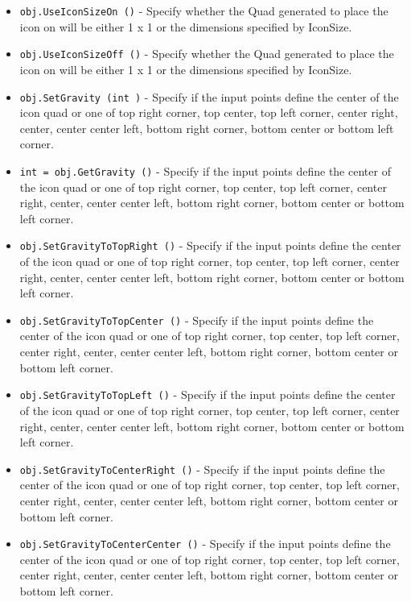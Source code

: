 \begin{itemize}
\item  \verb|obj.UseIconSizeOn ()| -  Specify whether the Quad generated to place the icon on will be either
 1 x 1 or the dimensions specified by IconSize.

\item  \verb|obj.UseIconSizeOff ()| -  Specify whether the Quad generated to place the icon on will be either
 1 x 1 or the dimensions specified by IconSize.

\item  \verb|obj.SetGravity (int )| -  Specify if the input points define the center of the icon quad or one of
 top right corner, top center, top left corner, center right, center, center
 center left, bottom right corner, bottom center or bottom left corner.

\item  \verb|int = obj.GetGravity ()| -  Specify if the input points define the center of the icon quad or one of
 top right corner, top center, top left corner, center right, center, center
 center left, bottom right corner, bottom center or bottom left corner.

\item  \verb|obj.SetGravityToTopRight ()| -  Specify if the input points define the center of the icon quad or one of
 top right corner, top center, top left corner, center right, center, center
 center left, bottom right corner, bottom center or bottom left corner.

\item  \verb|obj.SetGravityToTopCenter ()| -  Specify if the input points define the center of the icon quad or one of
 top right corner, top center, top left corner, center right, center, center
 center left, bottom right corner, bottom center or bottom left corner.

\item  \verb|obj.SetGravityToTopLeft ()| -  Specify if the input points define the center of the icon quad or one of
 top right corner, top center, top left corner, center right, center, center
 center left, bottom right corner, bottom center or bottom left corner.

\item  \verb|obj.SetGravityToCenterRight ()| -  Specify if the input points define the center of the icon quad or one of
 top right corner, top center, top left corner, center right, center, center
 center left, bottom right corner, bottom center or bottom left corner.

\item  \verb|obj.SetGravityToCenterCenter ()| -  Specify if the input points define the center of the icon quad or one of
 top right corner, top center, top left corner, center right, center, center
 center left, bottom right corner, bottom center or bottom left corner.


\end{itemize}
